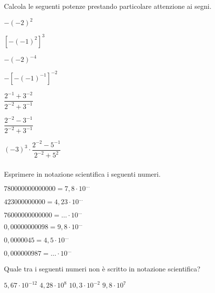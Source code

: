 \begin{esercizio}
 \label{ese:3.60}
Calcola le seguenti potenze prestando particolare attenzione ai segni.
\begin{multicols}{3}
\begin{enumeratea}
 \spazielenx
 \item $-(-2)^2$
 \item $[-(-1)^{2}]^3$
 \item $-(-2)^{-4}$
 \item $-[-(-1)^{-1}]^{-2}$
 \item $\dfrac{2^{-1}+3^{-2}}{2^{-2}+3^{-1}}$
 \item $\dfrac{2^{-2}-3^{-1}}{2^{-2}+3^{-1}}$
 \item $(-3)^3\cdot\dfrac{2^{-2}-5^{-1}}{2^{-2}+5^2}$
\end{enumeratea}
\end{multicols}
\end{esercizio}

\subsubsection*{}

\begin{esercizio}
 \label{ese:3.61}
Esprimere in notazione scientifica i seguenti numeri.
\begin{multicols}{2}
\begin{enumeratea}
\item $780000000000000=7,8\cdot10^{\ldots}$
\item $423000000000=4,23\cdot10^{\ldots}$
\item $76000000000000= \ldots \cdot 10^{\ldots}$
\item $0,00000000098=9,8\cdot10^{\ldots}$
\item $0,0000045=4,5\cdot10^{\ldots}$
\item $0,000000987= \ldots \cdot 10^{\ldots}$
\end{enumeratea}
\end{multicols}
\end{esercizio}

\begin{esercizio}
 \label{ese:3.62}
Quale tra i seguenti numeri non è scritto in notazione scientifica?

\boxA\quad$5,67\cdot 10^{-12}$\qquad
\boxB\quad$4,28\cdot 10^8$\qquad
\boxC\quad$10,3\cdot 10^{-2}$\qquad
\boxD\quad$9,8\cdot 10^7$\qquad
\end{esercizio}

